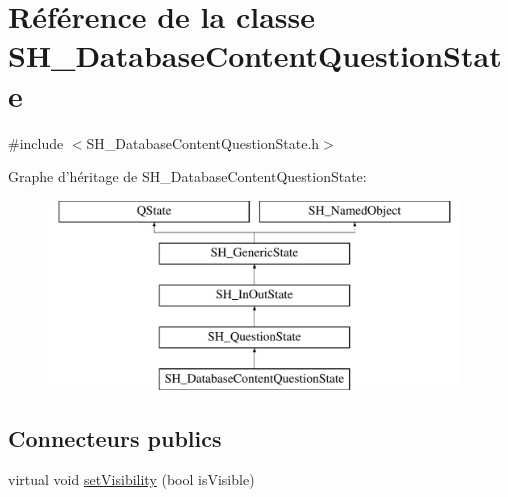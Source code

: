 \hypertarget{classSH__DatabaseContentQuestionState}{\section{Référence de la classe S\-H\-\_\-\-Database\-Content\-Question\-State}
\label{classSH__DatabaseContentQuestionState}
}


{\ttfamily \#include $<$S\-H\-\_\-\-Database\-Content\-Question\-State.\-h$>$}

Graphe d'héritage de S\-H\-\_\-\-Database\-Content\-Question\-State\-:\begin{figure}[H]
\begin{center}
\leavevmode
\includegraphics[height=5.000000cm]{classSH__DatabaseContentQuestionState}
\end{center}
\end{figure}
\subsection*{Connecteurs publics}
\begin{DoxyCompactItemize}
\item 
virtual void \hyperlink{classSH__InOutState_a7fdfaa6f600f0ac4a96f238a038ba9ad}{set\-Visibility} (bool is\-Visible)
\end{DoxyCompactItemize}
